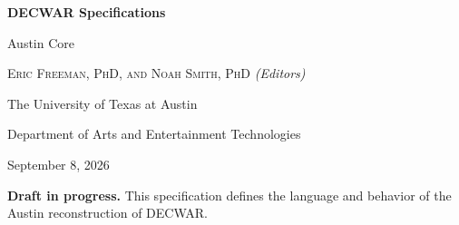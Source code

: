 \begin{titlepage}
\thispagestyle{empty}
\centering
\vspace*{0.15\textheight}

{\fontsize{28}{34}\selectfont\bfseries DECWAR Specifications\par}
\vspace{0.35cm}
{\Large\color{decwarblue} Austin Core\par}

\vspace{2.2cm}
{\large\textsc{Eric Freeman, PhD, and Noah Smith, PhD}
\textit{(Editors)}\par}
\vspace{0.55cm}
{\large The University of Texas at Austin\par}
\vspace{0.2cm}
{\normalsize Department of Arts and Entertainment Technologies\par}

\vfill
{\large September 8, 2026\par}
\vspace{1.4cm}

\begin{minipage}{0.82\textwidth}
\centering
\textbf{Draft in progress.} This specification defines the language and
behavior of the Austin reconstruction of DECWAR.
\end{minipage}

\vspace*{0.08\textheight}
\end{titlepage}
\clearpage
